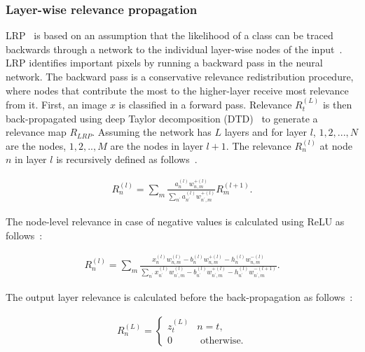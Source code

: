 \subsubsection{Layer-wise relevance propagation}
LRP~\cite{LRP1} is based on an assumption that the likelihood of a class can be traced backwards through a network to the individual layer-wise nodes of the input~\cite{LRP2}. LRP identifies important pixels by running a backward pass in the neural network. The backward pass is a conservative relevance redistribution procedure, where nodes that contribute the most to the higher-layer receive most relevance from it. First, an image $x$ is classified in a forward pass. Relevance $R_{t}^{(L)}$ is then back-propagated using deep Taylor decomposition (DTD)~\cite{DTD} to generate a relevance map $R_{LRP}$. Assuming the network has $L$ layers and for layer $l$, $1,2,...,N$ are the nodes, $1,2,..,M$ are the nodes in layer $l+ 1$. The relevance $R_{n}^{(l)}$ at node $n$ in layer $l$ is recursively defined as follows~\cite{LRP2}.  

\vspace{-4mm}
\begin{align}
    R_{n}^{(l)}=\sum_{m} \frac{a_{n}^{(l)} w_{n, m}^{+(l)}}{\sum_{n^{\prime}} a_{n^{\prime}}^{(l)} w_{n^{\prime}, m}^{+(l)}} R_{m}^{(l+1)}.
\end{align}

The node-level relevance in case of negative values is calculated using ReLU as follows~\cite{LRP2}:

\vspace{-4mm}
\begin{align}
    R_{n}^{(l)}=\sum_{m} \frac{x_{n}^{(l)} w_{n, m}^{(l)}-b_{n}^{(l)} w_{n, m}^{+(l)}-h_{n}^{(l)} w_{n, m}^{-(l)}}{\sum_{n^{\prime}} x_{n^{\prime}}^{(l)} w_{n^{\prime}, m}^{(l)}-b_{n^{\prime}}^{(l)} w_{n^{\prime}, m}^{+(l)}-h_{n^{\prime}}^{(l)} w_{n^{\prime}, m}^{-(l+1)}}.
    \label{eq:rn_neg}
\end{align}

The output layer relevance is calculated before the back-propagation as follows~\cite{LRP2}:

\vspace{-4mm}
\begin{align}
    R_{n}^{(L)}=\left\{\begin{array}{ll}
    {z_{t}^{(L)}} & {n=t}, \\
    {0} & {\text { otherwise.}}
    \end{array}\right.
    \label{eq:rn}
\end{align}


